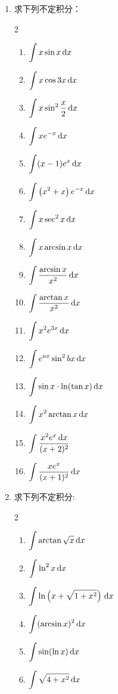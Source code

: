 \begin{ex}
\begin{enumerate}
    \item 求下列不定积分：
\begin{multicols}{2}
\begin{enumerate}
    \item $\displaystyle\int x \sin x\,{\rm d} x$
    \item $\displaystyle\int x \cos 3 x\,{\rm d} x$
    \item $\displaystyle\int x \sin ^{2} \dfrac{x}{2}\,{\rm d} x$
    \item $\displaystyle\int x e^{-x}\,{\rm d} x$
    \item $\displaystyle\int (x-1) e^{x}\,{\rm d} x$
    \item $\displaystyle\int \left(x^{2}+x\right) e^{-x}\,{\rm d} x$
    \item $\displaystyle\int  x \sec ^{2} x\,{\rm d} x$
    \item $\displaystyle\int  x \arcsin x\,{\rm d} x$
    \item $\displaystyle\int  \dfrac{\arcsin x}{x^{2}}\,{\rm d} x$
    \item $\displaystyle\int  \dfrac{\arctan x}{x^{2}}\,{\rm d} x$
    \item $\displaystyle\int  x^{2} e^{3 x}\,{\rm d} x$
    \item $\displaystyle\int  e^{a x} \sin ^{2} b x\,{\rm d} x$
    \item $\displaystyle\int  \sin x \cdot \ln (\tan x)\,{\rm d} x$
    \item $\displaystyle\int  x^{2} \arctan x\,{\rm d} x$
    \item $\displaystyle\int  \dfrac{x^{2} e^{x}\,{\rm d} x}{(x+2)^{2}}$
    \item $\displaystyle\int \dfrac{x e^{x}}{(x+1)^{2}}\,{\rm d} x$
\end{enumerate}
\end{multicols}
 \item   求下列不定积分:    
   \begin{multicols}{2}
        \begin{enumerate}
    \item $\displaystyle\int \arctan \sqrt{x}\,{\rm d} x$
    \item $\displaystyle\int \ln ^{2} x \,{\rm d} {x}$
    \item $\displaystyle\int \ln \left(x+\sqrt{1+x^{2}}\right)\,{\rm d} x$
    \item $\displaystyle\int (\arcsin x)^{2}\,{\rm d} x$
    \item $\displaystyle\int \sin(\ln x)\,{\rm d} x$
    \item $\displaystyle\int \sqrt{4+x^2}\,{\rm d} x$
\end{enumerate}
\end{multicols}
\end{enumerate}
\end{ex}
    
